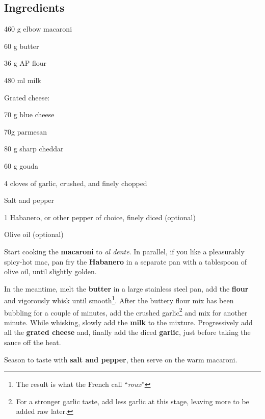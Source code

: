 \newpage
{}

\subsection*{Ingredients}
\begin{ingredients}
	\item 460 g elbow macaroni
	\item 60 g butter
	\item 36 g AP flour
	\item 480 ml milk
	\item Grated cheese: 
	\begin{ingredients}
		\item 70 g blue cheese
		\item 70g parmesan
		\item 80 g sharp cheddar
		\item 60 g gouda
	\end{ingredients}
	\item 4 cloves of garlic,  crushed, and  finely chopped
	\item Salt and pepper
	\item 1 Habanero, or other pepper of choice, finely diced (optional) 
	\item Olive oil (optional)
\end{ingredients}

\medskip

Start cooking the \textbf{macaroni} to \textit{al dente}.
In parallel, if you like a pleasurably spicy-hot mac, pan fry the \textbf{Habanero} in a separate pan with a tablespoon of olive oil, until slightly golden. 

In the meantime, melt the \textbf{butter} in a large stainless steel pan, add the \textbf{flour} and vigorously whisk until smooth\footnote{The result is what the French call ``\textit{roux}''}. 
After the buttery flour mix has been bubbling for a couple of minutes, add the crushed garlic\footnote{For a stronger garlic taste, add less garlic at this stage, leaving more to be added raw later.} and mix for another minute.
While whisking, slowly add the \textbf{milk} to the mixture.
Progressively add all the \textbf{grated cheese} and, finally add the diced \textbf{garlic}, just before taking the sauce off the heat.

Season to taste with \textbf{salt and pepper}, then serve on the warm macaroni.

\vspace*{0.75 cm}

\begin{recipeblock}
	
\end{recipeblock}